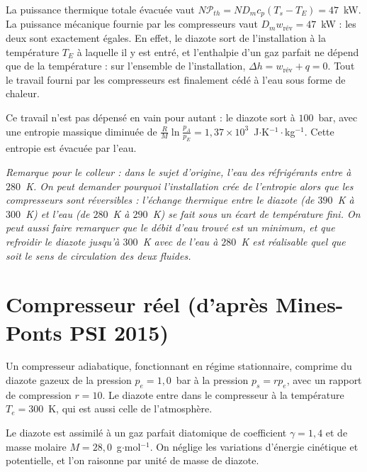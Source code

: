 \begin{correction}
\begin{enumerate}
	La puissance thermique totale évacuée vaut $N\mathcal{P}_{th}=ND_mc_p(T_s-T_E)=47$~kW. La puissance mécanique fournie par les compresseurs vaut $D_mw_{\text{rév}}=47$~kW : les deux sont exactement égales. En effet, le diazote sort de l'installation à la température $T_E$ à laquelle il y est entré, et l'enthalpie d'un gaz parfait ne dépend que de la température : sur l'ensemble de l'installation, $\Delta h=w_{\text{rév}}+q=0$. Tout le travail fourni par les compresseurs est finalement cédé à l'eau sous forme de chaleur.

	Ce travail n'est pas dépensé en vain pour autant : le diazote sort à $100$~bar, avec une entropie massique diminuée de $\frac{R}{M}\ln\frac{p_A}{p_E}=1{,}37\times10^{3}$~J$\cdot$K$^{-1}\cdot$kg$^{-1}$. Cette entropie est évacuée par l'eau.

	\textit{Remarque pour le colleur : dans le sujet d'origine, l'eau des réfrigérants entre à $280$~K. On peut demander pourquoi l'installation crée de l'entropie alors que les compresseurs sont réversibles : l'échange thermique entre le diazote (de $390$~K à $300$~K) et l'eau (de $280$~K à $290$~K) se fait sous un écart de température fini. On peut aussi faire remarquer que le débit d'eau trouvé est un minimum, et que refroidir le diazote jusqu'à $300$~K avec de l'eau à $280$~K est réalisable quel que soit le sens de circulation des deux fluides.}

\end{enumerate}

\end{correction}

\newpage

\section{Compresseur réel (d'après Mines-Ponts PSI 2015)}

Un compresseur adiabatique, fonctionnant en régime stationnaire, comprime du diazote gazeux de la pression $p_e=1{,}0$~bar à la pression $p_s=rp_e$, avec un rapport de compression $r=10$. Le diazote entre dans le compresseur à la température $T_e=300$~K, qui est aussi celle de l'atmosphère.

Le diazote est assimilé à un gaz parfait diatomique de coefficient $\gamma=1{,}4$ et de masse molaire $M=28{,}0$~g$\cdot$mol$^{-1}$. On néglige les variations d'énergie cinétique et potentielle, et l'on raisonne par unité de masse de diazote.


